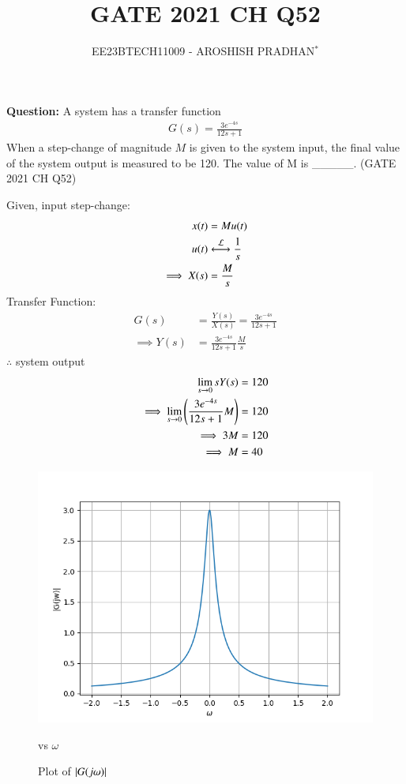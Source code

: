 \documentclass[journal,12pt,twocolumn]{IEEEtran}
\theoremstyle{remark}
\begin{document}

\vspace{3cm}

\title{GATE 2021 CH Q52}
\author{EE23BTECH11009 - AROSHISH PRADHAN$^{*}$%
}
\maketitle
\newpage
\bigskip
\textbf{Question:} A system has a transfer function
\begin{align}
    G(s) = \frac{3e^{-4s}}{12s + 1}\nonumber
\end{align}
When a step-change of magnitude $M$ is given to the system input, the final value of the system output is measured to be 120. The value of M is \_\_\_\_\_.
\hfill(GATE 2021 CH Q52)\\
\solution


Given, input step-change:
\begin{align}
    x(t) &= Mu(t)\\
    u(t) &\system{L} \frac{1}{s}\\
    \implies X(s) &= \frac{M}{s}
\end{align}
Transfer Function:
\begin{align}
    G(s) &= \frac{Y(s)}{X(s)} = \frac{3e^{-4s}}{12s + 1}\\
    \implies Y(s) &= \frac{3e^{-4s}}{12s + 1}\frac{M}{s}
\end{align}
$\therefore$ system output
\begin{align}
     \lim_{s\rightarrow0}sY(s) &= 120\\
    \implies \lim_{s\rightarrow0}\left(\frac{3e^{-4s}}{12s + 1}M\right) &= 120\\
    \implies 3M &= 120\\
    \implies M &= 40
\end{align}

\begin{figure}
    \centering
    \includegraphics[width = \columnwidth]{figs/assign9.png}
    \caption{Plot of $\left\vert G(j\omega)\right\vert$} vs $\omega$
    \label{fig:1_gate.21.ch.52}
\end{figure}
\end{document}
